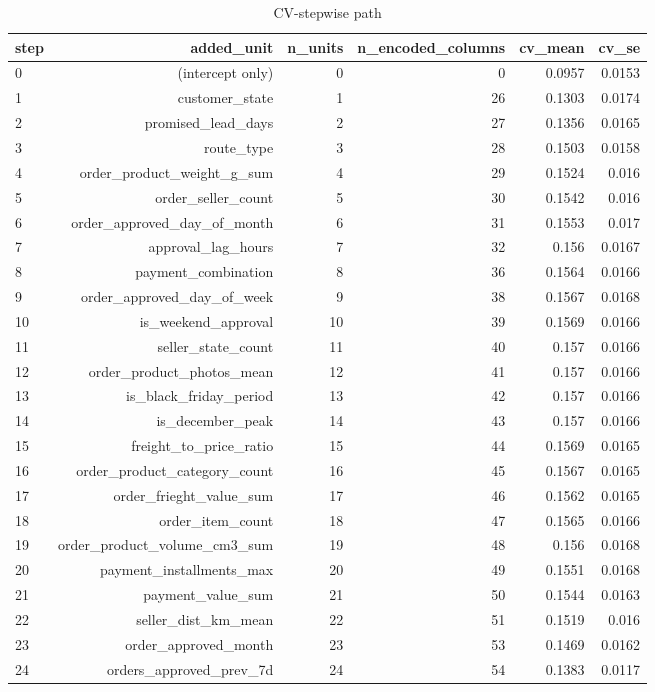\begin{table}[htbp]
\centering
\small
\caption{CV-stepwise path}
\begin{tabular}{lrrrrr}
\toprule
step & added\_unit & n\_units & n\_encoded\_columns & cv\_mean & cv\_se \\
\midrule
0 & (intercept only) & 0 & 0 & 0.0957 & 0.0153 \\
1 & customer\_state & 1 & 26 & 0.1303 & 0.0174 \\
2 & promised\_lead\_days & 2 & 27 & 0.1356 & 0.0165 \\
3 & route\_type & 3 & 28 & 0.1503 & 0.0158 \\
4 & order\_product\_weight\_g\_sum & 4 & 29 & 0.1524 & 0.016 \\
5 & order\_seller\_count & 5 & 30 & 0.1542 & 0.016 \\
6 & order\_approved\_day\_of\_month & 6 & 31 & 0.1553 & 0.017 \\
7 & approval\_lag\_hours & 7 & 32 & 0.156 & 0.0167 \\
8 & payment\_combination & 8 & 36 & 0.1564 & 0.0166 \\
9 & order\_approved\_day\_of\_week & 9 & 38 & 0.1567 & 0.0168 \\
10 & is\_weekend\_approval & 10 & 39 & 0.1569 & 0.0166 \\
11 & seller\_state\_count & 11 & 40 & 0.157 & 0.0166 \\
12 & order\_product\_photos\_mean & 12 & 41 & 0.157 & 0.0166 \\
13 & is\_black\_friday\_period & 13 & 42 & 0.157 & 0.0166 \\
14 & is\_december\_peak & 14 & 43 & 0.157 & 0.0166 \\
15 & freight\_to\_price\_ratio & 15 & 44 & 0.1569 & 0.0165 \\
16 & order\_product\_category\_count & 16 & 45 & 0.1567 & 0.0165 \\
17 & order\_frieght\_value\_sum & 17 & 46 & 0.1562 & 0.0165 \\
18 & order\_item\_count & 18 & 47 & 0.1565 & 0.0166 \\
19 & order\_product\_volume\_cm3\_sum & 19 & 48 & 0.156 & 0.0168 \\
20 & payment\_installments\_max & 20 & 49 & 0.1551 & 0.0168 \\
21 & payment\_value\_sum & 21 & 50 & 0.1544 & 0.0163 \\
22 & seller\_dist\_km\_mean & 22 & 51 & 0.1519 & 0.016 \\
23 & order\_approved\_month & 23 & 53 & 0.1469 & 0.0162 \\
24 & orders\_approved\_prev\_7d & 24 & 54 & 0.1383 & 0.0117 \\
\bottomrule
\end{tabular}
\par\smallskip\begin{minipage}{\linewidth}\footnotesize \end{minipage}
\end{table}

